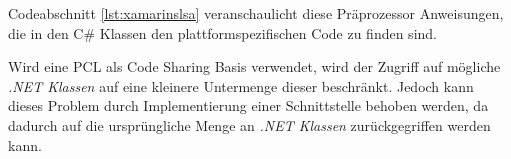 	Codeabschnitt \ref{lst:xamarinslsa} veranschaulicht diese Präprozessor Anweisungen, die in den C\# Klassen den plattformspezifischen Code zu finden sind.

	Wird eine PCL als Code Sharing Basis verwendet, wird der Zugriff auf mögliche \textit{.NET Klassen} auf eine kleinere Untermenge dieser beschränkt. Jedoch kann dieses Problem durch Implementierung einer Schnittstelle behoben werden, da dadurch auf die ursprüngliche Menge an \textit{.NET Klassen} zurückgegriffen werden kann.



















